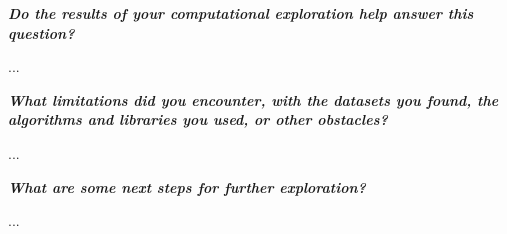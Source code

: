 \documentclass[12pt]{article}
\begin{document}
\begin{enumerate}
\begin{text}
\emph{\textbf{Do the results of your computational exploration help answer this question?}}

...

\emph{\textbf{What limitations did you encounter, with the datasets you found, the algorithms and libraries you used, or other obstacles?}}

...

\emph{\textbf{What are some next steps for further exploration?}}

...

\end{text}


\maketitle

\newpage




\end{enumerate}
\end{document}
